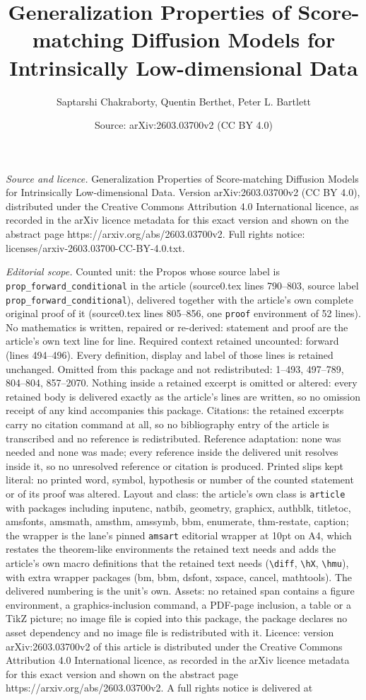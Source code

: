 \documentclass[10pt,a4paper]{amsart}
\title[Generalization Properties of Score-matching Diffusion Models]{Generalization Properties of Score-matching Diffusion Models for Intrinsically Low-dimensional Data}
\author{Saptarshi Chakraborty, Quentin Berthet, Peter L. Bartlett}
\date{Source: arXiv:2603.03700v2 (CC BY 4.0)}
\begin{document}
\maketitle

\noindent\emph{Source and licence.} Generalization Properties of Score-matching Diffusion Models for Intrinsically Low-dimensional Data. Version arXiv:2603.03700v2 (CC BY 4.0), distributed under the Creative Commons Attribution 4.0 International licence, as recorded in the arXiv licence metadata for this exact version and shown on the abstract page https://arxiv.org/abs/2603.03700v2. Full rights notice: licenses/arxiv-2603.03700-CC-BY-4.0.txt.\par\smallskip

\noindent\textit{Editorial scope.} Counted unit: the Propos whose source label is \texttt{prop\_forward\_conditional} in the article (source0.tex lines 790--803, source label \texttt{prop\_forward\_conditional}), delivered together with the article's own complete original proof of it (source0.tex lines 805--856, one \texttt{proof} environment of 52 lines). No mathematics is written, repaired or re-derived: statement and proof are the article's own text line for line. Required context retained uncounted: forward (lines 494--496). Every definition, display and label of those lines is retained unchanged. Omitted from this package and not redistributed: 1--493, 497--789, 804--804, 857--2070. Nothing inside a retained excerpt is omitted or altered: every retained body is delivered exactly as the article's lines are written, so no omission receipt of any kind accompanies this package. Citations: the retained excerpts carry no citation command at all, so no bibliography entry of the article is transcribed and no reference is redistributed. Reference adaptation: none was needed and none was made; every reference inside the delivered unit resolves inside it, so no unresolved reference or citation is produced. Printed slips kept literal: no printed word, symbol, hypothesis or number of the counted statement or of its proof was altered. Layout and class: the article's own class is \texttt{article} with packages including inputenc, natbib, geometry, graphicx, authblk, titletoc, amsfonts, amsmath, amsthm, amssymb, bbm, enumerate, thm-restate, caption; the wrapper is the lane's pinned \texttt{amsart} editorial wrapper at 10pt on A4, which restates the theorem-like environments the retained text needs and adds the article's own macro definitions that the retained text needs (\texttt{\textbackslash diff}, \texttt{\textbackslash hX}, \texttt{\textbackslash hmu}), with extra wrapper packages (bm, bbm, dsfont, xspace, cancel, mathtools). The delivered numbering is the unit's own. Assets: no retained span contains a figure environment, a graphics-inclusion command, a PDF-page inclusion, a table or a TikZ picture; no image file is copied into this package, the package declares no asset dependency and no image file is redistributed with it. Licence: version arXiv:2603.03700v2 of this article is distributed under the Creative Commons Attribution 4.0 International licence, as recorded in the arXiv licence metadata for this exact version and shown on the abstract page https://arxiv.org/abs/2603.03700v2. A full rights notice is delivered at 
\end{document}
